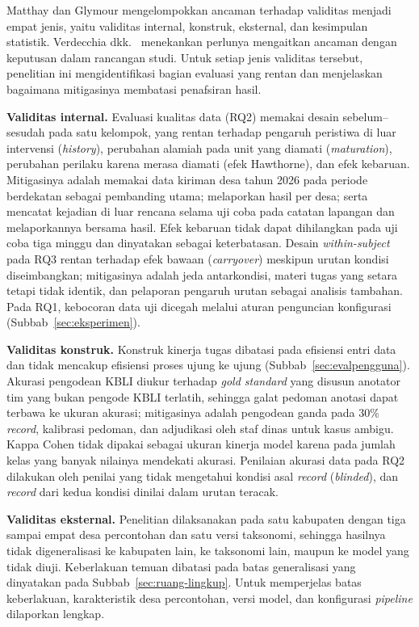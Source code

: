 Matthay dan Glymour \cite{matthay2020validity} mengelompokkan ancaman terhadap validitas menjadi empat jenis, yaitu validitas internal, konstruk, eksternal, dan kesimpulan statistik. Verdecchia dkk.\ \cite{verdecchia2023validity} menekankan perlunya mengaitkan ancaman dengan keputusan dalam rancangan studi. Untuk setiap jenis validitas tersebut, penelitian ini mengidentifikasi bagian evaluasi yang rentan dan menjelaskan bagaimana mitigasinya membatasi penafsiran hasil.

\textbf{Validitas internal.} Evaluasi kualitas data (RQ2) memakai desain sebelum--sesudah pada satu kelompok, yang rentan terhadap pengaruh peristiwa di luar intervensi (\textit{history}), perubahan alamiah pada unit yang diamati (\textit{maturation}), perubahan perilaku karena merasa diamati (efek Hawthorne), dan efek kebaruan. Mitigasinya adalah memakai data kiriman desa tahun 2026 pada periode berdekatan sebagai pembanding utama; melaporkan hasil per desa; serta mencatat kejadian di luar rencana selama uji coba pada catatan lapangan dan melaporkannya bersama hasil. Efek kebaruan tidak dapat dihilangkan pada uji coba tiga minggu dan dinyatakan sebagai keterbatasan. Desain \textit{within-subject} pada RQ3 rentan terhadap efek bawaan (\textit{carryover}) meskipun urutan kondisi diseimbangkan; mitigasinya adalah jeda antarkondisi, materi tugas yang setara tetapi tidak identik, dan pelaporan pengaruh urutan sebagai analisis tambahan. Pada RQ1, kebocoran data uji dicegah melalui aturan penguncian konfigurasi (Subbab~\ref{sec:eksperimen}).

\textbf{Validitas konstruk.} Konstruk kinerja tugas dibatasi pada efisiensi entri data dan tidak mencakup efisiensi proses ujung ke ujung (Subbab~\ref{sec:evalpengguna}). Akurasi pengodean KBLI diukur terhadap \textit{gold standard} yang disusun anotator tim yang bukan pengode KBLI terlatih, sehingga galat pedoman anotasi dapat terbawa ke ukuran akurasi; mitigasinya adalah pengodean ganda pada 30\% \textit{record}, kalibrasi pedoman, dan adjudikasi oleh staf dinas untuk kasus ambigu. Kappa Cohen tidak dipakai sebagai ukuran kinerja model karena pada jumlah kelas yang banyak nilainya mendekati akurasi. Penilaian akurasi data pada RQ2 dilakukan oleh penilai yang tidak mengetahui kondisi asal \textit{record} (\textit{blinded}), dan \textit{record} dari kedua kondisi dinilai dalam urutan teracak.

\textbf{Validitas eksternal.} Penelitian dilaksanakan pada satu kabupaten dengan tiga sampai empat desa percontohan dan satu versi taksonomi, sehingga hasilnya tidak digeneralisasi ke kabupaten lain, ke taksonomi lain, maupun ke model yang tidak diuji. Keberlakuan temuan dibatasi pada batas generalisasi yang dinyatakan pada Subbab~\ref{sec:ruang-lingkup}. Untuk memperjelas batas keberlakuan, karakteristik desa percontohan, versi model, dan konfigurasi \textit{pipeline} dilaporkan lengkap.

